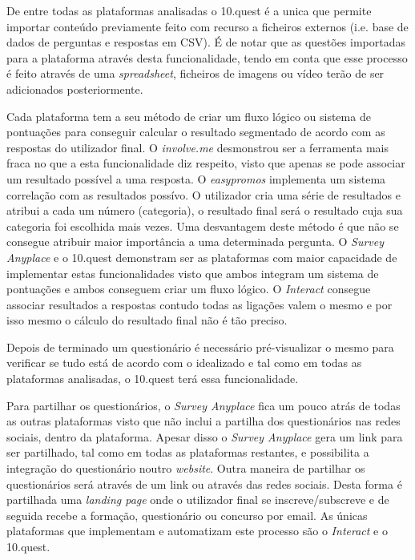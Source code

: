De entre todas as plataformas analisadas o 10.quest é a unica que permite importar conteúdo previamente feito com recurso a ficheiros externos (i.e. base de dados de perguntas e respostas em CSV). É de notar que as questões importadas para a plataforma através desta funcionalidade, tendo em conta que esse processo é feito através de uma \textit{spreadsheet}, ficheiros de imagens ou vídeo terão de ser adicionados posteriormente.

Cada plataforma tem a seu método de criar um fluxo lógico ou sistema de pontuações para conseguir calcular o resultado segmentado de acordo com as respostas do utilizador final. O \textit{involve.me} desmonstrou ser a ferramenta mais fraca no que a esta funcionalidade diz respeito, visto que apenas se pode associar um resultado possível a uma resposta. O \textit{easypromos} implementa um sistema correlação com as resultados possívo. O utilizador cria uma série de resultados e atribui a cada um número (categoria), o resultado final será o resultado cuja sua categoria foi escolhida mais vezes. Uma desvantagem deste método é que não se consegue atribuir maior importância a uma determinada pergunta. O \textit{Survey Anyplace} e o 10.quest demonstram ser as plataformas com maior capacidade de implementar estas funcionalidades visto que ambos integram um sistema de pontuações e ambos conseguem criar um fluxo lógico. O \textit{Interact} consegue associar resultados a respostas contudo todas as ligações valem o mesmo e por isso mesmo o cálculo do resultado final não é tão preciso.


Depois de terminado um questionário é necessário pré-visualizar o mesmo para verificar se tudo está de acordo com o idealizado e tal como em todas as plataformas analisadas, o 10.quest terá essa funcionalidade.

Para partilhar os questionários, o \textit{Survey Anyplace} fica um pouco atrás de todas as outras plataformas visto que não inclui a partilha dos questionários nas redes sociais, dentro da plataforma. Apesar disso o \textit{Survey Anyplace} gera um link para ser partilhado, tal como em todas as plataformas restantes, e possibilita a integração do questionário noutro \textit{website}. 
Outra maneira de partilhar os questionários será através de um link ou através das redes sociais. Desta forma é partilhada uma \textit{landing page} onde o utilizador final se inscreve/subscreve e de seguida recebe a formação, questionário ou concurso por email. As únicas plataformas que implementam e automatizam este processo são o \textit{Interact} e o 10.quest.


